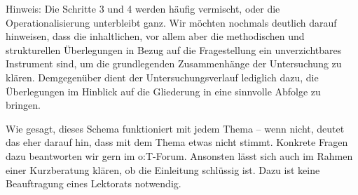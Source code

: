 Hinweis: Die Schritte 3 und 4 werden häufig vermischt, oder die Operationalisierung unterbleibt ganz. Wir möchten nochmals deutlich
darauf hinweisen, dass die inhaltlichen, vor allem aber die methodischen und strukturellen Überlegungen in Bezug auf die
Fragestellung ein unverzichtbares Instrument sind, um die grundlegenden Zusammenhänge der Untersuchung zu klären. Demgegenüber
dient der Untersuchungsverlauf lediglich dazu, die Überlegungen im Hinblick auf die Gliederung in eine sinnvolle Abfolge zu
bringen.

Wie gesagt, dieses Schema funktioniert mit jedem Thema – wenn nicht, deutet das eher darauf hin, dass mit dem Thema etwas nicht
stimmt. Konkrete Fragen dazu beantworten wir gern im o:T-Forum. Ansonsten lässt sich auch im Rahmen einer Kurzberatung klären, ob
die Einleitung schlüssig ist. Dazu ist keine Beauftragung eines Lektorats notwendig.
